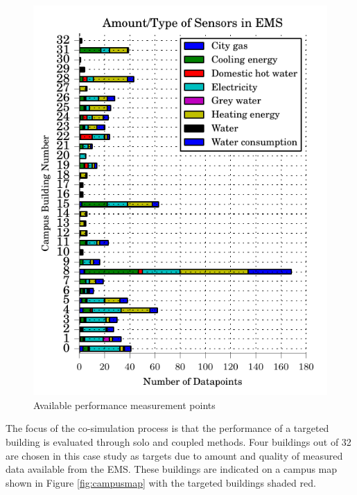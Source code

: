 \documentclass{tBPS2e}
\theoremstyle{plain}
\theoremstyle{definition}
\theoremstyle{remark}
\begin{document}
\begin{figure}
\centering
\includegraphics[scale=1.0]{figures/pointbreakdown_anon}
\caption{Available performance measurement points}
\label{fig:pointgraph}
\end{figure}

The focus of the co-simulation process is that the performance of a targeted building is evaluated through solo and coupled methods. Four buildings out of 32 are chosen in this case study as targets due to amount and quality of measured data available from the EMS. These buildings are indicated on a campus map shown in Figure \ref{fig:campusmap} with the targeted buildings shaded red.

\end{document}
